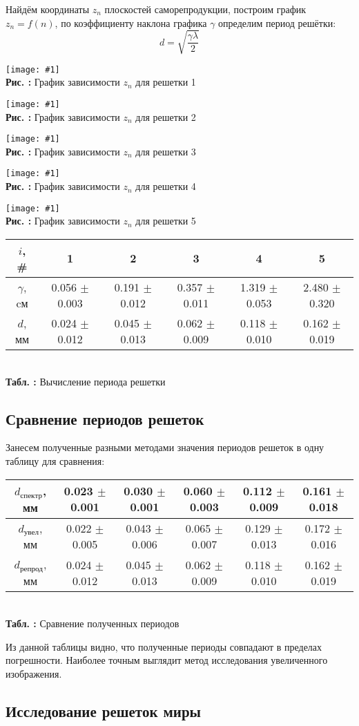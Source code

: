 \documentclass[12pt,a4paper]{article}
\newcounter{picture}
\newcounter{tbl}
\newcommand{\embedeps}[3]{\begin{center}
		\texttt{[image: \#1]}
		\\\textbf{Рис. \thepicture:} #3
		\label{pic_\thepicture}
		\addtocounter{picture}{1}
\end{center}}
\newcommand{\embedtbl}[3]{\begin{center}
		\begin{tabular}{#1}
			#2
		\end{tabular}
		\\\textbf{Табл. \thetbl:} #3
		\label{tbl_\thetbl}
		\addtocounter{tbl}{1}
\end{center}}
\begin{document}
	Найдём координаты  $z_n$ плоскостей саморепродукции, построим график $z_n=f(n)$, по коэффициенту наклона графика $\gamma$ определим период решётки:
	\begin{equation}
		d = \sqrt{\frac{\gamma \lambda}{2}}        
	\end{equation}
	
	\embedeps{PIC_6.eps}{0.7}{График зависимости $z_n$ для решетки 1}
	\embedeps{PIC_7.eps}{0.7}{График зависимости $z_n$ для решетки 2}
	\embedeps{PIC_8.eps}{0.7}{График зависимости $z_n$ для решетки 3}
	\embedeps{PIC_9.eps}{0.7}{График зависимости $z_n$ для решетки 4}
	\embedeps{PIC_10.eps}{0.7}{График зависимости $z_n$ для решетки 5}
	
	\embedtbl{|c|c|c|c|c|c|}{
		\hline
		$i$, \# & 1 & 2 & 3 & 4 & 5
		\\\hline
		$\gamma$, cм & 0.056 $\pm$ 0.003 & 0.191 $\pm$ 0.012 & 0.357 $\pm$ 0.011 & 1.319 $\pm$ 0.053 & 2.480 $\pm$ 0.320
		\\\hline
		$d$, мм & 0.024 $\pm$ 0.012 & 0.045 $\pm$ 0.013 & 0.062 $\pm$ 0.009 & 0.118 $\pm$ 0.010 & 0.162 $\pm$ 0.019
		\\\hline
		
	}{Вычисление периода решетки}

	\subsection{Сравнение периодов решеток}
	
	Занесем полученные разными методами значения периодов решеток в одну таблицу для сравнения:
	
	\embedtbl{|c|c|c|c|c|c|}{
		\hline
		$d_{\text{спектр}}$, мм & 0.023 $\pm$ 0.001 & 0.030 $\pm$ 0.001 & 0.060 $\pm$ 0.003 & 0.112 $\pm$ 0.009 & 0.161 $\pm$ 0.018
		\\\hline
		$d_{\text{увел}}$, мм & 0.022 $\pm$ 0.005 & 0.043 $\pm$ 0.006 & 0.065 $\pm$ 0.007 & 0.129 $\pm$ 0.013 & 0.172 $\pm$ 0.016
		\\\hline
		$d_{\text{репрод}}$, мм & 0.024 $\pm$ 0.012 & 0.045 $\pm$ 0.013 & 0.062 $\pm$ 0.009 & 0.118 $\pm$ 0.010 & 0.162 $\pm$ 0.019
		\\\hline
	}{Сравнение полученных периодов}

	Из данной таблицы видно, что полученные периоды совпадают в пределах погрешности. Наиболее точным выглядит метод исследования увеличенного изображения.
	
	\subsection{Исследование решеток миры}
	
\end{document}
